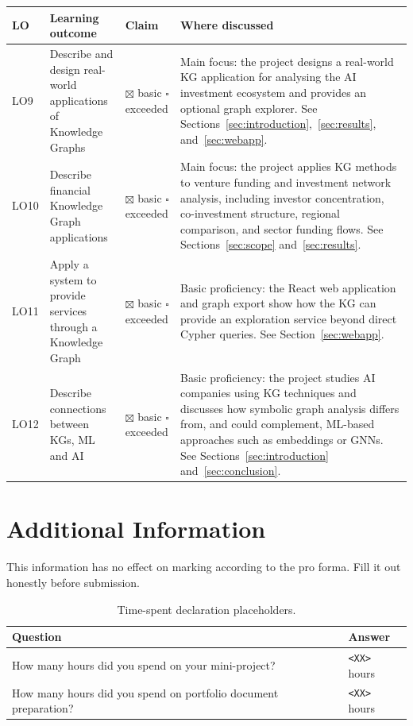 \documentclass[11pt,a4paper]{article}
\newcommand{\checkedbox}{\(\boxtimes\)}
\newcommand{\emptybox}{\(\square\)}
\begin{document}
\begin{longtable}{p{}p{}p{}p{}}
\toprule
LO & Learning outcome & Claim & Where discussed \\
\midrule
\endhead
LO9 & Describe and design real-world applications of Knowledge Graphs &
\checkedbox{} basic \quad \emptybox{} exceeded &
Main focus: the project designs a real-world KG application for analysing the
AI investment ecosystem and provides an optional graph explorer. See
Sections~\ref{sec:introduction},~\ref{sec:results}, and~\ref{sec:webapp}. \\
\addlinespace
LO10 & Describe financial Knowledge Graph applications &
\checkedbox{} basic \quad \emptybox{} exceeded &
Main focus: the project applies KG methods to venture funding and investment
network analysis, including investor concentration, co-investment structure,
regional comparison, and sector funding flows. See Sections~\ref{sec:scope}
and~\ref{sec:results}. \\
\addlinespace
LO11 & Apply a system to provide services through a Knowledge Graph &
\checkedbox{} basic \quad \emptybox{} exceeded &
Basic proficiency: the React web application and graph export show how the KG
can provide an exploration service beyond direct Cypher queries. See
Section~\ref{sec:webapp}. \\
\addlinespace
LO12 & Describe connections between KGs, ML and AI &
\checkedbox{} basic \quad \emptybox{} exceeded &
Basic proficiency: the project studies AI companies using KG techniques and
discusses how symbolic graph analysis differs from, and could complement,
ML-based approaches such as embeddings or GNNs. See Sections~\ref{sec:introduction}
and~\ref{sec:conclusion}. \\
\bottomrule
\end{longtable}

\newpage
\section*{Additional Information}

This information has no effect on marking according to the pro forma. Fill it
out honestly before submission.

\begin{table}[H]
\centering
\begin{tabular}{p{}p{}}
\toprule
Question & Answer \\
\midrule
How many hours did you spend on your mini-project? & \texttt{<XX>} hours \\
How many hours did you spend on portfolio document preparation? & \texttt{<XX>} hours \\
\bottomrule
\end{tabular}
\caption{Time-spent declaration placeholders.}
\end{table}
\end{document}

